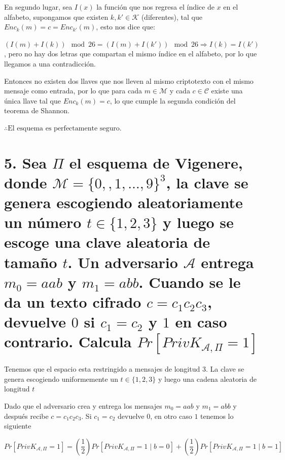 \documentclass[11pt]{article}
\begin{document}
\begin{enumerate}[label=\alph*)]
            En segundo lugar, sea $ I(x) $ la función que nos regresa el índice de $ x $ en el alfabeto, supongamos que existen $ k, k' \in \mathcal{K} $ (diferentes), tal que $ Enc_{k}(m) = c = Enc_{k'}(m) $, esto nos dice que:
            
            $ (I(m) + I(k)) \mod{26} = (I(m) + I(k')) \mod{26} \Rightarrow I(k) = I(k') $, pero no hay dos letras que compartan el mismo índice en el alfabeto, por lo que llegamos a una contradicción.
            
            Entonces no existen dos llaves que nos lleven al mismo criptotexto con el mismo mensaje como entrada, por lo que para cada $ m \in \mathcal{M} $ y cada $ c \in \mathcal{C} $ existe una única llave tal que $ Enc_{k}(m) = c $, lo que cumple la segunda condición del teorema de Shannon.
            
            $ \therefore \text{El esquema es perfectamente seguro.} $
            
        \end{enumerate}
        
        
        
        
        \section*{5. Sea $\Pi$ el esquema de Vigenere, donde $\mathcal{M} = \{0,,1,\dots,9\}^3$, la clave se genera escogiendo aleatoriamente un número $t \in \{1,2,3\}$ y luego se escoge una clave aleatoria de tamaño $t$.
        Un adversario $\mathcal{A}$ entrega $m_0 = aab$ y  $m_1 = abb$. Cuando se le da un texto cifrado $c = c_1 c_2 c_3$, devuelve $0$ si $c_1 = c_2$ y $1$ en caso contrario. Calcula $Pr[PrivK_{\mathcal{A},\Pi} = 1]$}
        
        Tenemos que el espacio esta restringido a mensajes de longitud 3. La clave se genera escogiendo uniformemente un $t \in \{1,2,3\}$ y luego una cadena aleatoria de longitud $t$
        
        Dado que el adversario crea y entrega los mensajes $m_0 = aab$ y $m_1 = abb$ y después recibe $c = c_1 c_2 c_3$. Si $c_1 = c_2$ devuelve $0$, en otro caso $1$ tenemos lo siguiente
        
        \begin{equation}
            Pr[PrivK_{\mathcal{A},\Pi} = 1] = (\frac{1}{2}) Pr[PrivK_{\mathcal{A},\Pi} = 1 \mid b = 0] +  (\frac{1}{2}) Pr[PrivK_{\mathcal{A},\Pi} = 1 \mid b = 1]
        \end{equation}
        
\end{document}
